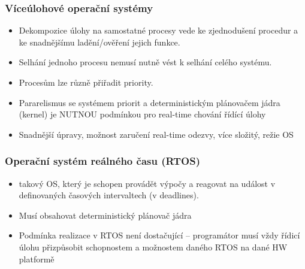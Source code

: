 \subsubsection*{Víceúlohové operační systémy}
\begin{itemize}
  \item Dekompozice úlohy na samostatné procesy vede ke zjednodušení procedur a ke snadnějšímu ladění/ověření jejich funkce.
  \item Selhání jednoho procesu nemusí nutně vést k selhání celého systému.
  \item Procesům lze různě přiřadit priority.
  \item Pararelismus se systémem priorit a deterministickým plánovačem jádra (kernel) je NUTNOU podmínkou pro real-time chování řídící úlohy
  \item Snadnější úpravy, možnost zaručení real-time odezvy, více složitý, režie OS
\end{itemize}

\subsubsection*{Operační systém reálného času (RTOS)}
\begin{itemize}
  \item takový OS, který je schopen provádět výpočy a reagovat na událost v definovaných časových intervaltech (v deadlines).
  \item Musí obsahovat deterministický plánovač jádra
  \item Podmínka realizace v RTOS není dostačující – programátor musí vždy řídicí úlohu přizpůsobit schopnostem a možnostem daného RTOS na dané HW platformě
\end{itemize}

